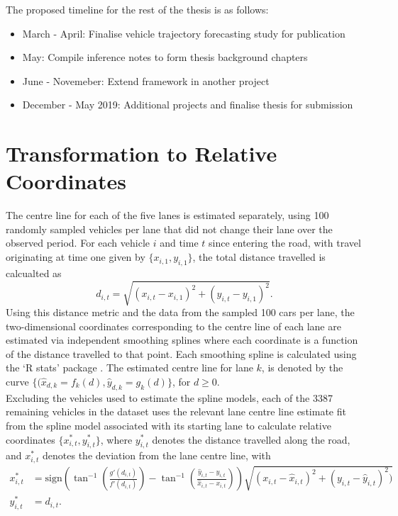 \documentclass[12pt,a4paper]{article}\usepackage[]{graphicx}\usepackage[]{color}
\begin{document}
The proposed timeline for the rest of the thesis is as follows:
\begin{itemize}
\item March - April: Finalise vehicle trajectory forecasting study for publication
\item May: Compile inference notes to form thesis background chapters
\item June - Novemeber: Extend framework in another project
\item December - May 2019: Additional projects and finalise thesis for submission
\end{itemize}


\newpage



\appendix
\section{Transformation to Relative Coordinates}

The centre line for each of the five lanes is estimated separately, using 100 randomly sampled vehicles per lane that did not change their lane over the observed period. 
For each vehicle $i$ and time $t$ since entering the road, with travel originating at time one given by $\{x_{i,1}, y_{i,1}\}$, the total distance travelled is calcualted as 
\begin{equation}
\label{distance}
d_{i, t} = \sqrt{(x_{i, t} - x_{i, 1})^2 + (y_{i, t} - y_{i, 1})^2}.
\end{equation}
Using this distance metric and the data from the sampled 100 cars per lane, the two-dimensional coordinates corresponding to the centre line of each lane are estimated via independent smoothing splines where each coordinate is a function of the distance travelled to that point. Each smoothing spline is calculated using the `R stats' package \citep{R}. The estimated centre line for lane $k$, is denoted by the curve $\{(\hat{x}_{d,k} = f_k(d), \hat{y}_{d,k} = g_k(d)\}$, for $d \geq 0$.
\\

Excluding the vehicles used to estimate the spline models, each of the 3387 remaining vehicles in the dataset uses the relevant lane centre line estimate fit from the spline model associated with its starting lane to calculate relative coordinates $\{x^*_{i, t}, y^*_{i, t}\}$, where $y^*_{i, t}$ denotes the distance travelled along the road, and $x^*_{i, t}$ denotes the deviation from the lane centre line, with
\begin{align}
x^*_{i, t} &= \mbox{sign}\left(\tan^{-1}\left(\frac{g'(d_{i, t}) }{f'(d_{i, t})}\right) - \tan^{-1}\left(\frac{\hat{y}_{i, t} - y_{i, t}}{\hat{x}_{i, t} - x_{i, t}} \right)\right)\sqrt{(x_{i, t}-\hat{x}_{i, t})^2 + (y_{i, t} - \hat{y}_{i, t})^2)} \label{xRel} \\
y^*_{i, t} &= d_{i, t}. \label{yRel}
\end{align}
\\
\end{document}
